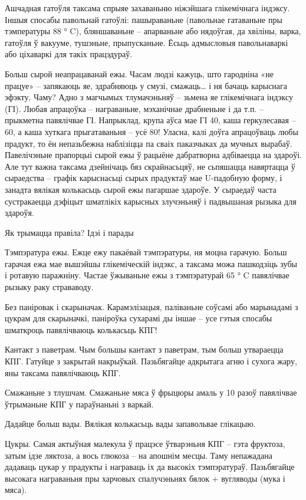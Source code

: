 Ашчадная гатоўля таксама спрыяе захаваньню ніжэйшага глікемічнага індэксу. Іншыя спосабы павольнай гатоўлі: пашыраваньне (павольнае гатаваньне пры тэмпературы 88 ° C), бляншаваньне – апарваньне або нядоўгая, да хвіліны, варка, гатоўля ў вакууме, тушэньне, прыпусканьне. Ёсьць адмысловыя павольнаваркі або ціхаваркі для такіх працэдураў.

Больш сырой неапрацаванай ежы.
Часам людзі кажуць, што гародніна «не працуе» – запякаюць яе, здрабняюць у смузі, смажаць… і ня бачаць карыснага эфэкту. Чаму? Адно з магчымых тлумачэньняў – зьмена яе глікемічнага індэксу (ГІ). Любая апрацоўка – награваньне, мэханічнае драбненьне і да т.п. – прыкметна павялічвае ГІ. Напрыклад, крупа аўса мае ГІ 40, каша геркулесавая – 60, а каша хуткага прыгатаваньня – усё 80! Уласна, калі доўга апрацоўваць любы прадукт, то ён непазьбежна наблізіцца па сваіх паказчыках да мучных вырабаў. Павелічэньне прапорцыі сырой ежы ў рацыёне дабратворна адбіваецца на здароўі. Але тут важна таксама дзейнічаць бяз скрайнасьцяў, не сьпяшацца навяртацца ў сыраедства – графік карыснасьці сырых прадуктаў мае U-падобную форму, і занадта вялікая колькасьць сырой ежы пагаршае здароўе. У сыраедаў часта сустракаецца дэфіцыт шматлікіх карысных злучэньняў і падвышаная рызыка для здароўя.

Як трымацца правіла? Ідэі і парады

Тэмпэратура ежы.
Ежце ежу пакаёвай тэмпэратуры, ня моцна гарачую. Больш гарачая ежа мае вышэйшы глікеміческій індэкс, а таксама можа пашкодзіць зубы і ротавую паражніну. Частае ўжываньне ежы з тэмпэратурай 65 ° C павялічвае рызыку раку страваводу.

Без паніровак і скарыначак.
Карамэлізацыя, паліваньне соўсамі або марынадамі з цукрам для скарыначкі, паніроўка сухарамі ды іншае – усе гэтыя спосабы шматкроць павялічваюць колькасьць КПГ!

Кантакт з паветрам.
Чым большы кантакт з паветрам, тым больш утвараецца КПГ. Гатуйце з закрытай накрыўкай. Пазьбягайце адкрытага агню і сухога жару, яны таксама павялічваюць КПГ.

Смажаньне з тлушчам.
Смажаньне мяса ў фрыцюры амаль у 10 разоў павялічвае ўтрыманьне КПГ у параўнаньні з варкай.

Дадайце больш вады.
Вялікая колькасьць вады запавольвае глікацыю.

Цукры.
Самая актыўная малекула ў працэсе ўтварэньня КПГ – гэта фруктоза, затым ідзе ляктоза, а вось глюкоза – на апошнім месцы. Таму непажадана дадаваць цукар у прадукты і награваць іх да высокіх тэмпэратураў. Пазьбягайце высокага награваньня пры харчовых спалучэньнях бялок + вугляводы (мука і мяса).

